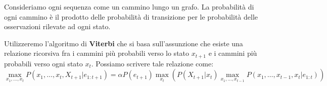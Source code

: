 \begin{itemize}
          Consideriamo ogni sequenza come un cammino lungo un grafo. La probabilità
          di ogni cammino è il prodotto delle probabilità di transizione per le
          probabilità delle osservazioni rilevate ad ogni stato.

          Utilizzeremo l'algoritmo di \textbf{Viterbi} che si basa sull'assunzione
          che esiste una relazione ricorsiva fra i cammini più probabili verso
          lo stato $x_{t+1}$ e i cammini più probabili verso ogni stato $x_t$.
          Possiamo scrivere tale relazione come:
          \begin{equation}
              \max _{x_1,\dots, x_t} P(x_1,\dots,x_t,X_{t+1}|e_{1:t+1}) = \alpha
              P(e_{t+1})\max_{x_t} \left(P(X_{t+1}|x_t)\max_{x_1,\dots,x_{t-1}}
              P(x_1,\dots,x_{t-1},x_t|e_{1:t})\right)
          \end{equation}
\end{itemize}


